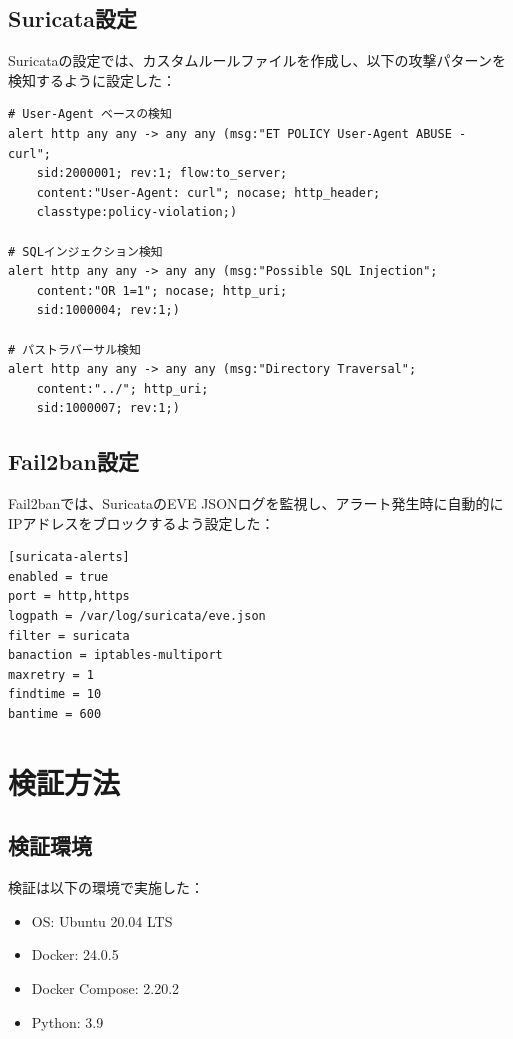 \documentclass[12pt,a4paper]{article}
\begin{document}
\subsection{Suricata設定}

Suricataの設定では、カスタムルールファイルを作成し、以下の攻撃パターンを検知するように設定した：

\begin{lstlisting}[caption=local.rules（検知ルール抜粋）]
# User-Agent ベースの検知
alert http any any -> any any (msg:"ET POLICY User-Agent ABUSE - curl"; 
    sid:2000001; rev:1; flow:to_server; 
    content:"User-Agent: curl"; nocase; http_header; 
    classtype:policy-violation;)

# SQLインジェクション検知
alert http any any -> any any (msg:"Possible SQL Injection"; 
    content:"OR 1=1"; nocase; http_uri; 
    sid:1000004; rev:1;)

# パストラバーサル検知
alert http any any -> any any (msg:"Directory Traversal"; 
    content:"../"; http_uri; 
    sid:1000007; rev:1;)
\end{lstlisting}

\subsection{Fail2ban設定}

Fail2banでは、SuricataのEVE JSONログを監視し、アラート発生時に自動的にIPアドレスをブロックするよう設定した：

\begin{lstlisting}[caption=jail.local（Fail2ban設定抜粋）]
[suricata-alerts]
enabled = true
port = http,https
logpath = /var/log/suricata/eve.json
filter = suricata
banaction = iptables-multiport
maxretry = 1
findtime = 10
bantime = 600
\end{lstlisting}

\section{検証方法}

\subsection{検証環境}
検証は以下の環境で実施した：
\begin{itemize}
    \item OS: Ubuntu 20.04 LTS
    \item Docker: 24.0.5
    \item Docker Compose: 2.20.2
    \item Python: 3.9
\end{itemize}
\end{document}

